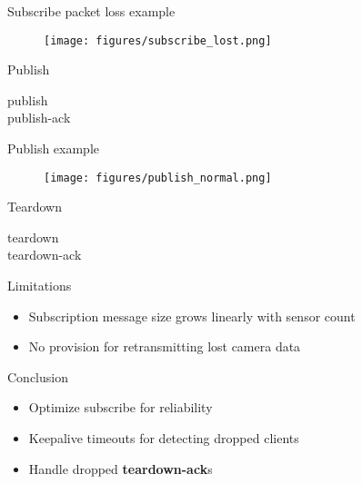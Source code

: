 \documentclass{beamer}
\begin{document}
\begin{frame}{Subscribe packet loss example}
\begin{figure}
	\texttt{[image: figures/subscribe\_lost.png]}
\end{figure}
\end{frame}

\begin{frame}{Publish}
\begin{description}
	\item[publish]
    \item[publish-ack]
\end{description}
\end{frame}

\begin{frame}{Publish example}
\begin{figure}
	\texttt{[image: figures/publish\_normal.png]}
\end{figure}
\end{frame}

\begin{frame}{Teardown}
\begin{description}
	\item[teardown]
    \item[teardown-ack]
\end{description}
\end{frame}

\begin{frame}{Limitations}
\begin{itemize}
	\item Subscription message size grows linearly with sensor count
    \item No provision for retransmitting lost camera data
\end{itemize}
\end{frame}

\begin{frame}{Conclusion}
\begin{itemize}
	\item Optimize subscribe for reliability
    \item Keepalive timeouts for detecting dropped clients
    \item Handle dropped \textbf{teardown-ack}s
\end{itemize}
\end{frame}
\end{document}
